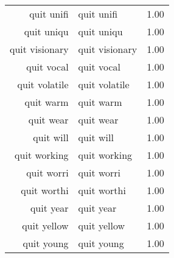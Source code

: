 \begin{table}[ht]
\begin{tabular}{rlr}
  quit unifi & quit unifi & 1.00 \\ 
  quit uniqu & quit uniqu & 1.00 \\ 
  quit visionary & quit visionary & 1.00 \\ 
  quit vocal & quit vocal & 1.00 \\ 
  quit volatile & quit volatile & 1.00 \\ 
  quit warm & quit warm & 1.00 \\ 
  quit wear & quit wear & 1.00 \\ 
  quit will & quit will & 1.00 \\ 
  quit working & quit working & 1.00 \\ 
  quit worri & quit worri & 1.00 \\ 
  quit worthi & quit worthi & 1.00 \\ 
  quit year & quit year & 1.00 \\ 
  quit yellow & quit yellow & 1.00 \\ 
  quit young & quit young & 1.00 \\ 
   \hline
\end{tabular}
\end{table}

